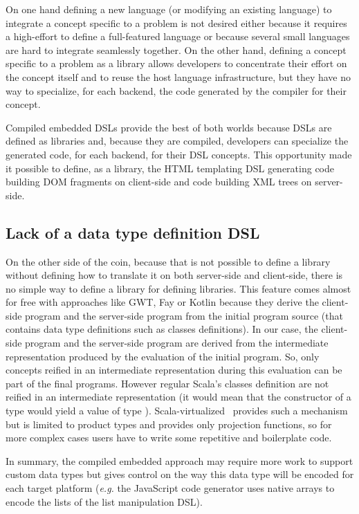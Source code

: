 \documentclass[american,english,runningheads]{llncs}
\newcommand{\eg}{\emph{e.g.}}
\begin{document}
On one hand defining a new language (or modifying an existing language) to integrate a concept specific to a problem
is not desired either because it requires a high-effort to define a full-featured language or because several small
languages are hard to integrate seamlessly together. On the other hand, defining a concept specific to a problem as a
library allows developers to concentrate their effort on the concept itself and to reuse the host language
infrastructure, but they have no way to specialize, for each backend, the code generated by the compiler for their
concept.

Compiled embedded DSLs provide the best of both worlds because DSLs are defined as libraries and, because they are
compiled, developers can specialize the generated code, for each backend, for their DSL concepts. This opportunity
made it possible to define, as a library, the HTML templating DSL generating code building DOM fragments on
client-side and code building XML trees on server-side.

\subsection{Lack of a data type definition DSL}

On the other side of the coin, because that is not possible to define a library without defining how to translate it
on both server-side and client-side, there is no simple way to define a library for defining libraries. This feature
comes almost for free with approaches like GWT, Fay or Kotlin because they derive the client-side program and the
server-side program from the initial program source (that contains data type definitions such as classes
definitions). In our case, the client-side program and the server-side program are derived from the intermediate
representation produced by the evaluation of the initial program. So, only concepts reified in an intermediate
representation during this evaluation can be part of the final programs. However regular Scala’s classes definition
are not reified in an intermediate representation (it would mean that the constructor of a type  would yield
a value of type ). Scala-virtualized~\cite{Moors12_Virtualized} provides such a mechanism but is 
limited to product types and provides only projection functions, so for more complex cases users have to write some
repetitive and boilerplate code.

In summary, the compiled embedded approach may require more work to support custom data types but gives control on
the way this data type will be encoded for each target platform (\eg{} the JavaScript code generator uses native
arrays to encode the lists of the list manipulation DSL).
\end{document}
